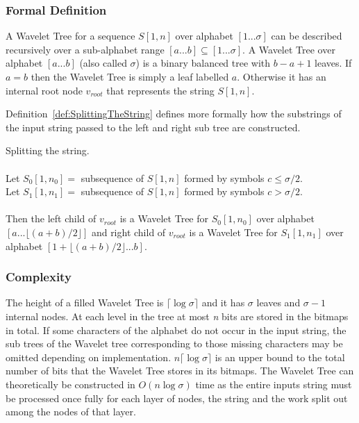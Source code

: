 \subsubsection{Formal Definition}
A Wavelet Tree for a sequence $S[1,n]$ over alphabet $[1 ... \sigma]$ can be described recursively over a sub-alphabet range $[a ... b] \subseteq [1 ... \sigma]$.
A Wavelet Tree over alphabet $[a ... b]$ (also called $\sigma$) is a binary balanced tree with $b - a + 1$ leaves. If $a = b$ then the Wavelet Tree is simply a leaf labelled $a$. 
Otherwise it has an internal root node $v_{root}$ that represents the string $S[1,n]$. 

Definition~\ref{def:SplittingTheString} defines more formally how the substrings of the input string passed to the left and right sub tree are constructed.


\vspace{0.5 cm}
\begin{mdframed}[nobreak, linecolor=lightgray, linewidth=2pt]
\begin{definition} Splitting the string. \\\\
Let $S_0[1,n_0] =$ subsequence of $S[1,n]$ formed by symbols $c \leq \sigma/2$.\\
Let $S_1[1,n_1] =$ subsequence of $S[1,n]$ formed by symbols $c > \sigma/2$.\\\\
Then the left child of $v_{root}$ is a Wavelet Tree for $S_0[1,n_0]$ over alphabet $[a ... \lfloor (a + b)/2 \rfloor]$ and right child of $v_{root}$ is a Wavelet Tree for $S_1[1,n_1]$ over alphabet $[1 + \lfloor (a + b)/2 \rfloor ... b]$.
\label{def:SplittingTheString}
\end{definition}
\end{mdframed}
\vspace{0.5 cm}


\subsubsection{Complexity}
The height of a filled Wavelet Tree is  $\lceil \log \sigma \rceil$ and it has $\sigma$ leaves and $\sigma - 1$ internal nodes. 
At each level in the tree at most \textit{n} bits are stored in the bitmaps in total.
If some characters of the alphabet do not occur in the input string, the sub trees of the Wavelet tree corresponding to those missing characters may be omitted depending on implementation.
$n \lceil \log \sigma \rceil$ is an upper bound to the total number of bits that the Wavelet Tree stores in its bitmaps.
The Wavelet Tree can theoretically be constructed in $O(n \log \sigma)$ time as the entire inputs string must be processed once fully for each layer of nodes, the string and the work split out among the nodes of that layer.


